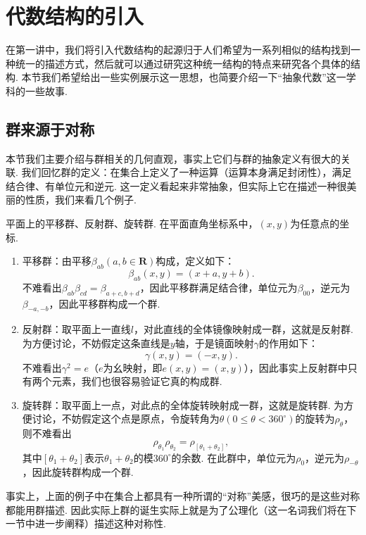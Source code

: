 \section*{代数结构的引入}

在第一讲中，我们将引入代数结构的起源归于人们希望为一系列相似的结构找到一种统一的描述方式，然后就可以通过研究这种统一结构的特点来研究各个具体的结构. 本节我们希望给出一些实例展示这一思想，也简要介绍一下``抽象代数''这一学科的一些故事.

\subsection*{群来源于对称}
本节我们主要介绍与群相关的几何直观，事实上它们与群的抽象定义有很大的关联. 我们回忆群的定义：在集合上定义了一种运算（运算本身满足封闭性），满足结合律、有单位元和逆元. 这一定义看起来非常抽象，但实际上它在描述一种很美丽的性质，我们来看几个例子.

\begin{example*}
    平面上的平移群、反射群、旋转群. 在平面直角坐标系中，$(x,y)$为任意点的坐标.
    \begin{enumerate}
        \item 平移群：由平移$\beta_{ab}(a,b\in\mathbf{R})$构成，定义如下：
        \[\beta_{ab}(x,y)=(x+a,y+b).\]
        不难看出$\beta_{ab}\beta_{cd}=\beta_{a+c,b+d}$，因此平移群满足结合律，单位元为$\beta_{00}$，逆元为$\beta_{-a,-b}$，因此平移群构成一个群.

        \item 反射群：取平面上一直线$l$，对此直线的全体镜像映射成一群，这就是反射群. 为方便讨论，不妨假定这条直线是$y$轴，于是镜面映射$\gamma$的作用如下：
        \[\gamma(x,y)=(-x,y).\]
        不难看出$\gamma^2=e$（$e$为幺映射，即$e(x,y)=(x,y)$），因此事实上反射群中只有两个元素，我们也很容易验证它真的构成群.

        \item 旋转群：取平面上一点，对此点的全体旋转映射成一群，这就是旋转群. 为方便讨论，不妨假定这个点是原点，令旋转角为$\theta(0\leqslant\theta<360^\circ)$的旋转为$\rho_\theta$，则不难看出
        \[\rho_{\theta_1}\rho_{\theta_2}=\rho_{[\theta_1+\theta_2]},\]
        其中$[\theta_1+\theta_2]$表示$\theta_1+\theta_2$的模$360^\circ$的余数. 在此群中，单位元为$\rho_0$，逆元为$\rho_{-\theta}$，因此旋转群构成一个群.
    \end{enumerate}
\end{example*}

事实上，上面的例子中在集合上都具有一种所谓的``对称''美感，很巧的是这些对称都能用群描述. 因此实际上群的诞生实际上就是为了公理化（这一名词我们将在下一节中进一步阐释）描述这种对称性.

